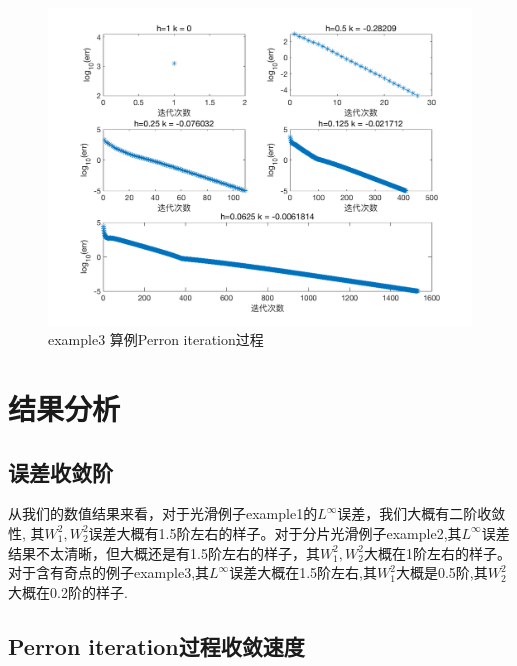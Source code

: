 \documentclass[11pt]{article}
\begin{document}
\begin{figure}[htp!]
\centering
\caption{example3 算例Perron iteration过程}
\includegraphics[width=1.0\textwidth]{3.png}
\end{figure}


\clearpage

\section{结果分析}
\subsection{误差收敛阶}
从我们的数值结果来看，对于光滑例子example1的$L^\infty{}$误差，我们大概有二阶收敛性, 其$W_1^2,W_2^2$误差大概有1.5阶左右的样子。对于分片光滑例子example2,其$L^\infty{}$误差结果不太清晰，但大概还是有1.5阶左右的样子，其$W_1^2,W_2^2$大概在1阶左右的样子。对于含有奇点的例子example3,其$L^\infty{}$误差大概在1.5阶左右,其$W_1^2$大概是0.5阶,其$W_2^2$大概在0.2阶的样子.




\subsection{Perron iteration过程收敛速度}
\end{document}
